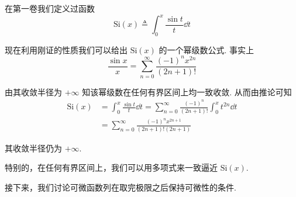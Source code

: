 \begin{example}
    在第一卷我们定义过函数
$$
\mathrm{Si}(x)\triangleq\int_0^x\frac{\sin t}{t}\dd t
$$

    现在利用刚证的性质我们可以给出 $\mathrm{Si}(x)$ 的一个幂级数公式. 事实上
$$
\frac{\sin x}{x}=\sum_{n=0}^\infty\frac{(-1)^nx^{2n}}{(2n+1)!}
$$

    由其收敛半径为 $+\infty$ 知该幂级数在任何有界区间上均一致收敛. 从而由推论可知
$$
\begin{aligned}
    \mathrm{Si}(x)&=\int_0^x\frac{\sin t}{t}\dd t=\sum_{n=0}^\infty\frac{(-1)^n}{(2n+1)!}\int_0^xt^{2n}\dd t\\
    &=\sum_{n=0}^\infty\frac{(-1)^nx^{2n+1}}{(2n+1)!(2n+1)}
\end{aligned}
$$

    其收敛半径仍为 $+\infty$.

    特别的，在任何有界区间上，我们可以用多项式来一致逼近 $\mathrm{Si}(x)$.
\end{example}


接下来，我们讨论可微函数列在取完极限之后保持可微性的条件.

